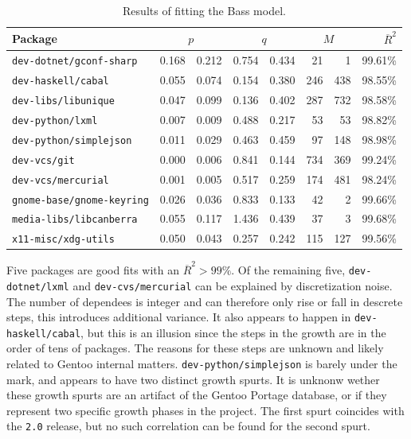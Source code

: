 \documentclass[smallextended,final]{svjour3}
\begin{document}
\begin{table}
\small\centering
\caption{Results of fitting the Bass model.}\label{tbl:testresults}
\begin{tabular}{lr@{ $\pm$}rr@{ $\pm$}rr@{ $\pm$}rr}
\toprule
Package & \multicolumn{2}{c}{$p$} & \multicolumn{2}{c}{$q$} & \multicolumn{2}{c}{$M$} & $\overline{R}^2$\\
\midrule
\texttt{dev-dotnet/gconf-sharp}   & 0.168 & 0.212 & 0.754 & 0.434 &  21 &   1 & 99.61\%\\
\texttt{dev-haskell/cabal}        & 0.055 & 0.074 & 0.154 & 0.380 & 246 & 438 & 98.55\%\\
\texttt{dev-libs/libunique}       & 0.047 & 0.099 & 0.136 & 0.402 & 287 & 732 & 98.58\%\\
\texttt{dev-python/lxml}          & 0.007 & 0.009 & 0.488 & 0.217 &  53 &  53 & 98.82\%\\
\texttt{dev-python/simplejson}    & 0.011 & 0.029 & 0.463 & 0.459 &  97 & 148 & 98.98\%\\
\texttt{dev-vcs/git}              & 0.000 & 0.006 & 0.841 & 0.144 & 734 & 369 & 99.24\%\\
\texttt{dev-vcs/mercurial}        & 0.001 & 0.005 & 0.517 & 0.259 & 174 & 481 & 98.24\%\\
\texttt{gnome-base/gnome-keyring} & 0.026 & 0.036 & 0.833 & 0.133 &  42 &   2 & 99.66\%\\
\texttt{media-libs/libcanberra}   & 0.055 & 0.117 & 1.436 & 0.439 &  37 &   3 & 99.68\%\\
\texttt{x11-misc/xdg-utils}       & 0.050 & 0.043 & 0.257 & 0.242 & 115 & 127 & 99.56\%\\
\bottomrule
\end{tabular}
\end{table}


Five packages are good fits with an $\overline{R}^2 > 99\%$. Of the remaining five, \texttt{dev-dotnet/lxml} and \texttt{dev-cvs/mercurial} can be explained by discretization noise. The number of dependees is integer and can therefore only rise or fall in descrete steps, this introduces additional variance. It also appears to happen in \texttt{dev-haskell/cabal}, but this is an illusion since the steps in the growth are in the order of tens of packages. The reasons for these steps are unknown and likely related to Gentoo internal matters. \texttt{dev-python/simplejson} is barely under the mark, and appears to have two distinct growth spurts. It is unknonw wether these growth spurts are an artifact of the Gentoo Portage database, or if they represent two specific growth phases in the project. The first spurt coincides with the \texttt{2.0} release, but no such correlation can be found for the second spurt.
\end{document}
